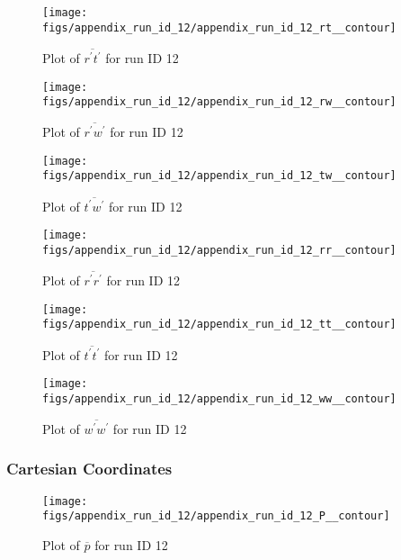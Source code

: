 \begin{figure}[H]
\centering
\texttt{[image: figs/appendix\_run\_id\_12/appendix\_run\_id\_12\_rt\_\_contour]}
\caption{Plot of $\overline{r^\prime t^\prime}$ for run ID 12}
\label{fig:appendix_run_id_12_rt__contour}
\end{figure}


\begin{figure}[H]
\centering
\texttt{[image: figs/appendix\_run\_id\_12/appendix\_run\_id\_12\_rw\_\_contour]}
\caption{Plot of $\overline{r^\prime w^\prime}$ for run ID 12}
\label{fig:appendix_run_id_12_rw__contour}
\end{figure}


\begin{figure}[H]
\centering
\texttt{[image: figs/appendix\_run\_id\_12/appendix\_run\_id\_12\_tw\_\_contour]}
\caption{Plot of $\overline{t^\prime w^\prime}$ for run ID 12}
\label{fig:appendix_run_id_12_tw__contour}
\end{figure}


\begin{figure}[H]
\centering
\texttt{[image: figs/appendix\_run\_id\_12/appendix\_run\_id\_12\_rr\_\_contour]}
\caption{Plot of $\overline{r^\prime r^\prime}$ for run ID 12}
\label{fig:appendix_run_id_12_rr__contour}
\end{figure}


\begin{figure}[H]
\centering
\texttt{[image: figs/appendix\_run\_id\_12/appendix\_run\_id\_12\_tt\_\_contour]}
\caption{Plot of $\overline{t^\prime t^\prime}$ for run ID 12}
\label{fig:appendix_run_id_12_tt__contour}
\end{figure}


\begin{figure}[H]
\centering
\texttt{[image: figs/appendix\_run\_id\_12/appendix\_run\_id\_12\_ww\_\_contour]}
\caption{Plot of $\overline{w^\prime w^\prime}$ for run ID 12}
\label{fig:appendix_run_id_12_ww__contour}
\end{figure}


\subsubsection{Cartesian Coordinates}
\begin{figure}[H]
\centering
\texttt{[image: figs/appendix\_run\_id\_12/appendix\_run\_id\_12\_P\_\_contour]}
\caption{Plot of $\overline{p}$ for run ID 12}
\label{fig:appendix_run_id_12_P__contour}
\end{figure}


